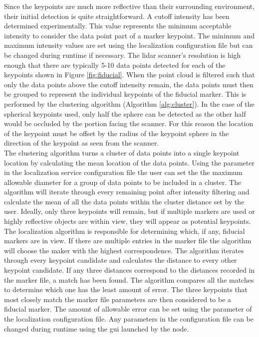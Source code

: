 Since the keypoints are much more reflective than their surrounding environment, their initial detection is quite straightforward. A cutoff intensity has been determined experimentally. This value represents the minimum acceptable intensity to consider the data point part of a marker keypoint. The minimum and maximum intensity values are set using the localization configuration file but can be changed during runtime if necessary. The \acrshort{lidar} scanner's resolution is high enough that there are typically 5-10 data points detected for each of the keypoints shown in Figure \ref{fig:fiducial}. When the point cloud is filtered such that only the data points above the cutoff intensity remain, the data points must then be grouped to represent the individual keypoints of the fiducial marker. This is performed by the clustering algorithm (Algorithm \ref{alg:cluster}). In the case of the spherical keypoints used, only half the sphere can be detected as the other half would be occluded by the portion facing the scanner. For this reason the location of the keypoint must be offset by the radius of the keypoint sphere in the direction of the keypoint as seen from the scanner.\\

The clustering algorithm turns a cluster of data points into a single keypoint location by calculating the mean location of the data points. Using the  parameter in the localization service configuration file the user can set the the maximum allowable diameter for a group of data points to be included in a cluster. The algorithm will iterate through every remaining point after intensity filtering and calculate the mean of all the data points within the cluster distance set by the user. Ideally, only three keypoints will remain, but if multiple markers are used or highly reflective objects are within view, they will appear as potential keypoints.\\

The localization algorithm is responsible for determining which, if any, fiducial markers are in view. If there are multiple entries in the marker file the algorithm will choose the maker with the highest correspondence. The algorithm iterates through every keypoint candidate and calculates the distance to every other keypoint candidate. If any three distances correspond to the distances recorded in the marker file, a match has been found. The algorithm compares all the matches to determine which one has the least amount of error. The three keypoints that most closely match the marker file parameters are then considered to be a fiducial marker. The amount of allowable error can be set using the  parameter of the localization configuration file. Any parameters in the configuration file can be changed during runtime using the \acrshort{gui} launched by the  node.\\

